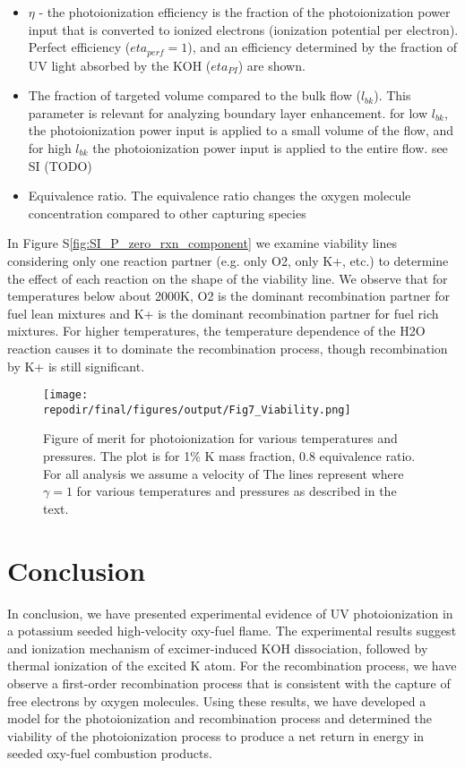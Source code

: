 \begin{itemize}
    \item $\eta$ - the photoionization efficiency is the fraction of the photoionization power input that is converted to ionized electrons (ionization potential per electron). Perfect efficiency ($eta_{perf} = 1$), and an efficiency determined by the fraction of UV light absorbed by the KOH ($eta_{PI}$) are shown.
    \item The fraction of targeted volume compared to the bulk flow ($l_{bk}$). This parameter is relevant for analyzing boundary layer enhancement. for low $l_{bk}$, the photoionization power input is applied to a small volume of the flow, and for high $l_{bk}$ the photoionization power input is applied to the entire flow. see SI (TODO)
    \item Equivalence ratio. The equivalence ratio changes the oxygen molecule concentration compared to other capturing species
\end{itemize}


In Figure S\ref{fig:SI_P_zero_rxn_component} we examine viability lines considering only one reaction partner (e.g. only O2, only K+, etc.) to determine the effect of each reaction on the shape of the viability line. We observe that for temperatures below about 2000K, O2 is the dominant recombination partner for fuel lean mixtures and K+ is the dominant recombination partner for fuel rich mixtures. For higher temperatures, the temperature dependence of the H2O reaction causes it to dominate the recombination process, though recombination by K+ is still significant. 


\begin{figure}[h]
    \centering
    \texttt{[image: \\repodir/final/figures/output/Fig7\_Viability.png]} 
    \caption{Figure of merit for photoionization for various temperatures and pressures. The plot is for 1\% K mass fraction, 0.8 equivalence ratio. For all analysis we assume a velocity of  The lines represent where $\gamma = 1$ for various temperatures and pressures as described in the text.}   
    \label{fig:viability_gamma}
\end{figure}



\section{Conclusion}

In conclusion, we have presented experimental evidence of UV photoionization in a potassium seeded high-velocity oxy-fuel flame. The experimental results suggest and ionization mechanism of excimer-induced KOH dissociation, followed by thermal ionization of the excited K atom. For the recombination process, we have observe a first-order recombination process that is consistent with the capture of free electrons by oxygen molecules. Using these results, we have developed a model for the photoionization and recombination process and determined the viability of the photoionization process to produce a net return in energy in seeded oxy-fuel combustion products. 